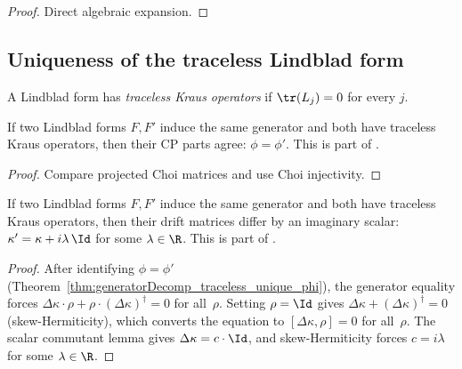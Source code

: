 \begin{proof}
    \leanok
    Direct algebraic expansion.
\end{proof}

\subsection{Uniqueness of the traceless Lindblad form}

\begin{definition}\label{def:has_traceless_kraus}
    \leanok
    A Lindblad form has \emph{traceless Kraus operators} if
    $\tr(L_j) = 0$ for every $j$.
\end{definition}

\begin{theorem}
    \label{thm:generatorDecomp_traceless_unique_phi}
    \leanok
    If two Lindblad forms $F, F'$ induce the same generator and
    both have traceless Kraus operators, then their CP parts agree:
    $\phi = \phi'$.
    This is part of \cite[Proposition~7.4(2)]{Wolf2012Quantum}.
\end{theorem}

\begin{proof}\leanok
    Compare projected Choi matrices and use Choi injectivity.
\end{proof}

\begin{theorem}
    \label{thm:generatorDecomp_traceless_unique_kappa}
    \leanok
    If two Lindblad forms $F, F'$ induce the same generator and
    both have traceless Kraus operators, then their drift matrices
    differ by an imaginary scalar: $\kappa' = \kappa + i\lambda\,\Id$
    for some $\lambda \in \R$.
    This is part of \cite[Proposition~7.4(2)]{Wolf2012Quantum}.
\end{theorem}

\begin{proof}\leanok
    After identifying $\phi = \phi'$
    (Theorem~\ref{thm:generatorDecomp_traceless_unique_phi}),
    the generator equality forces
    $\Delta\kappa \cdot \rho + \rho \cdot (\Delta\kappa)^\dagger = 0$
    for all~$\rho$. Setting $\rho = \Id$ gives $\Delta\kappa + (\Delta\kappa)^\dagger = 0$
    (skew-Hermiticity), which converts the equation to
    $[\Delta\kappa, \rho] = 0$ for all~$\rho$.
    The scalar commutant lemma gives $\Delta\kappa = c \cdot \Id$,
    and skew-Hermiticity forces $c = i\lambda$ for some $\lambda \in \R$.
\end{proof}


